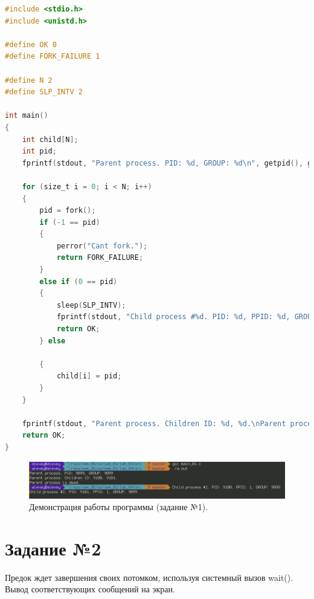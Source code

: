 \documentclass[12pt]{report}
\begin{document}
\begin{lstlisting}[label=some-code,caption=Процессы-сироты,language=C]
#include <stdio.h>
#include <unistd.h>

#define OK 0
#define FORK_FAILURE 1

#define N 2
#define SLP_INTV 2

int main()
{
	int child[N];
	int pid;
	fprintf(stdout, "Parent process. PID: %d, GROUP: %d\n", getpid(), getpgrp());

	for (size_t i = 0; i < N; i++)
	{
		pid = fork();
		if (-1 == pid)
		{
			perror("Cant fork.");
			return FORK_FAILURE;
		}
		else if (0 == pid)
		{
			sleep(SLP_INTV);
			fprintf(stdout, "Child process #%d. PID: %d, PPID: %d, GROUP: %d\n", i + 1, getpid(), getppid(), getpgrp());
			return OK;
		} else

		{
			child[i] = pid;
		}
	}
	
	fprintf(stdout, "Parent process. Children ID: %d, %d.\nParent process is dead.\n", child[0], child[1]);
	return OK;
}
\end{lstlisting}

\begin{figure}[H]

	\centering

	\includegraphics[width=\linewidth]{img/task01.png}
	\caption{Демонстрация работы программы (задание №1).}

	\label{fig:task01}

\end{figure}

\section*{Задание №2}

Предок ждет завершения своих потомком, используя системный вызов
wait(). Вывод соответствующих сообщений на экран.
\end{document}
